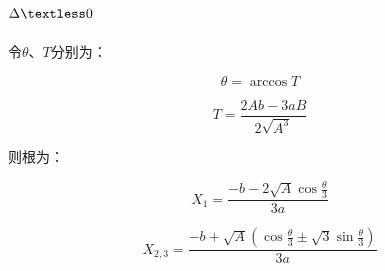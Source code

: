 \documentclass{ctexart}
\begin{document}
\subsection{$\Delta \textless 0$}

令$\theta$、$T$分别为：

\begin{equation}
    \theta=\arccos T
\end{equation}

\begin{equation}
    T=\frac{2Ab-3aB}{2\sqrt{A^3}}
\end{equation}

则根为：

\begin{equation}
    X_1=\frac{-b-2\sqrt{A}\cos\frac{\theta}{3}}{3a}
\end{equation}

\begin{equation}
    X_{2,3}=\frac{-b+\sqrt{A}(\cos\frac{\theta}{3}\pm \sqrt{3}\sin\frac{\theta}{3})}{3a}
\end{equation}
\end{document}
